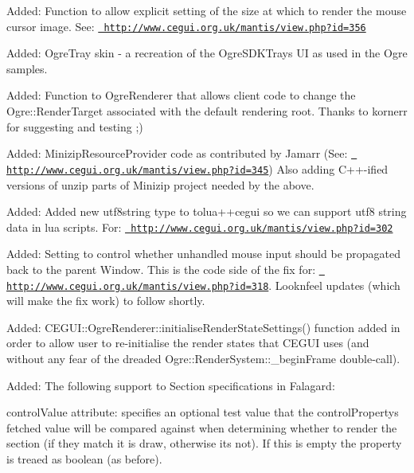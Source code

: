 \begin{DoxyItemize}
\item Added\+: Function to allow explicit setting of the size at which to render the mouse cursor image. See\+: \href{http://www.cegui.org.uk/mantis/view.php?id=356}{\texttt{ http\+://www.\+cegui.\+org.\+uk/mantis/view.\+php?id=356}}
\item Added\+: Ogre\+Tray skin -\/ a recreation of the Ogre\+S\+D\+K\+Trays UI as used in the Ogre samples.
\item Added\+: Function to Ogre\+Renderer that allows client code to change the Ogre\+::\+Render\+Target associated with the default rendering root. Thanks to kornerr for suggesting and testing ;)
\item Added\+: Minizip\+Resource\+Provider code as contributed by Jamarr (See\+: \href{http://www.cegui.org.uk/mantis/view.php?id=345}{\texttt{ http\+://www.\+cegui.\+org.\+uk/mantis/view.\+php?id=345}}) Also adding C++-\/ified versions of \textquotesingle{}unzip\textquotesingle{} parts of Minizip project needed by the above.
\item Added\+: Added new \textquotesingle{}utf8string\textquotesingle{} type to tolua++cegui so we can support utf8 string data in lua scripts. For\+: \href{http://www.cegui.org.uk/mantis/view.php?id=302}{\texttt{ http\+://www.\+cegui.\+org.\+uk/mantis/view.\+php?id=302}}
\item Added\+: Setting to control whether unhandled mouse input should be propagated back to the parent Window. This is the code side of the fix for\+: \href{http://www.cegui.org.uk/mantis/view.php?id=318}{\texttt{ http\+://www.\+cegui.\+org.\+uk/mantis/view.\+php?id=318}}. Looknfeel updates (which will make the fix \textquotesingle{}work\textquotesingle{}) to follow shortly.
\item Added\+: C\+E\+G\+U\+I\+::\+Ogre\+Renderer\+::initialise\+Render\+State\+Settings() function added in order to allow user to re-\/initialise the render states that C\+E\+G\+UI uses (and without any fear of the dreaded Ogre\+::\+Render\+System\+::\+\_\+begin\+Frame double-\/call).
\item Added\+: The following support to Section specifications in Falagard\+:
\begin{DoxyItemize}
\item control\+Value attribute\+: specifies an optional \textquotesingle{}test\textquotesingle{} value that the control\+Property\textquotesingle{}s fetched value will be compared against when determining whether to render the section (if they match it is draw, otherwise it\textquotesingle{}s not). If this is empty the property is treaed as boolean (as before).

\end{DoxyItemize}
\end{DoxyItemize}
